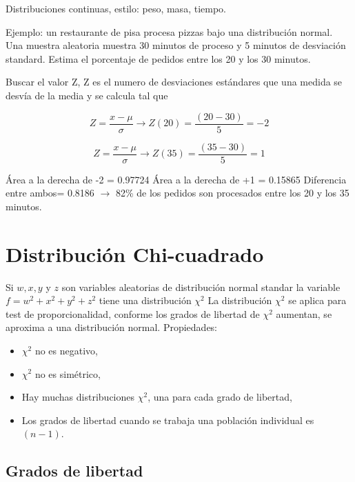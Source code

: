 \documentclass[oneside]{book}
\begin{document}
Distribuciones continuas, estilo: peso, masa, tiempo. 

Ejemplo: un restaurante de pisa procesa pizzas bajo una distribución normal. Una muestra aleatoria muestra 30 minutos de proceso y 5 minutos de desviación standard. Estima el porcentaje de pedidos entre los 20 y los 30 minutos.

Buscar el valor Z, Z es el numero de desviaciones estándares que una medida se desvía de la media y se calcula tal que

\begin{equation}
Z = \frac{x - \mu}{\sigma} \longrightarrow Z(20) = \frac{(20-30)}{5} = -2
\end{equation}

\begin{equation}
Z = \frac{x - \mu}{\sigma} \longrightarrow Z(35) = \frac{(35-30)}{5} = 1
\end{equation}

Área a la derecha de -2 = 0.97724 \newline
Área a la derecha de +1 = 0.15865 \newline
Diferencia entre ambos= 0.8186 $\longrightarrow$ 82\% de los pedidos son procesados entre los 20 y los 35 minutos.


\section{Distribución Chi-cuadrado}

Si $w, x, y$ y $z$ son variables aleatorias de distribución normal standar la variable $f = w^2 + x^2 + y^2 + z^2$ tiene una distribución $\chi^2$
La distribución $\chi^2$ se aplica para test de proporcionalidad, conforme los grados de libertad de $\chi^2$ aumentan, se aproxima a una distribución normal. Propiedades:

\begin{itemize}
	\item $\chi^2$ no es negativo,
	\item $\chi^2$ no es simétrico,
	\item Hay muchas distribuciones $\chi^2$, una para cada grado de libertad,
	\item Los grados de libertad cuando se trabaja una población individual es $(n-1)$.
\end{itemize}


\subsection{Grados de libertad}
\end{document}
